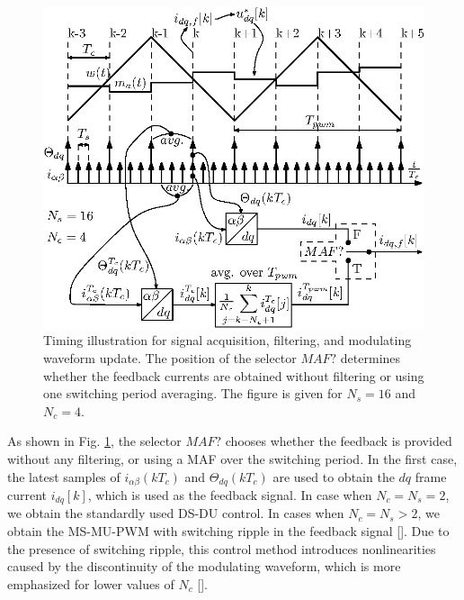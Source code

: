 \documentclass[journal]{IEEEtran}
\begin{document}
\begin{figure}[t!]
    \centerline{\includegraphics[width=0.95\linewidth]{figures/timing_diagram.eps}}
    \caption{Timing illustration for signal acquisition, filtering, and modulating waveform update. The position of the selector $MAF?$ determines whether the feedback currents are obtained without filtering or using one switching period averaging. The figure is given for $N_s = 16$ and $N_c = 4$.}
    \label{fig:timings}
\end{figure}

As shown in Fig. \ref{fig:timings}, the selector $MAF?$ chooses whether the feedback is provided without any filtering, or using a MAF over the switching period. In the first case, the latest samples of $i_{\alpha \beta}(kT_c)$ and $\Theta_{dq}(kT_c)$ are used to obtain the $dq$ frame current $i_{dq}[k]$, which is used as the feedback signal. In case when $N_c = N_s = 2$, we obtain the standardly used DS-DU control. In cases when $N_c = N_s > 2$, we obtain the MS-MU-PWM with switching ripple in the feedback signal []. Due to the presence of switching ripple, this control method introduces nonlinearities caused by the discontinuity of the modulating waveform, which is more emphasized for lower values of $N_c$ [].
\end{document}
